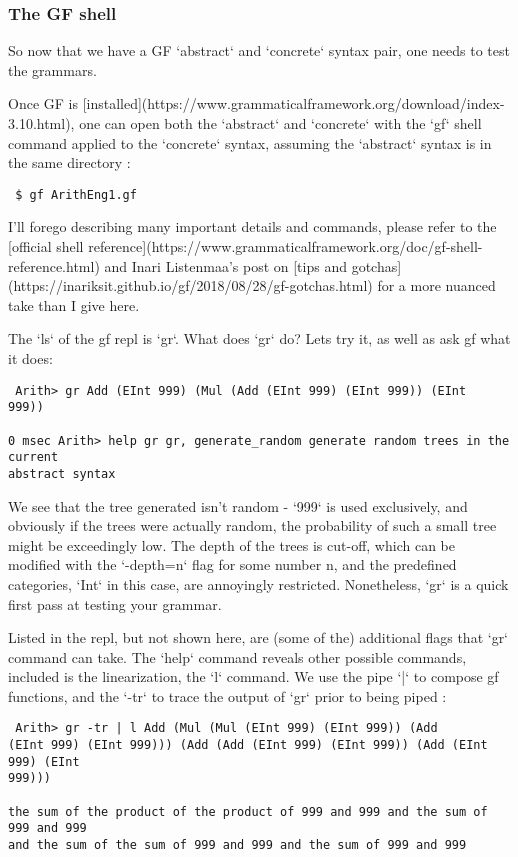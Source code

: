 \subsubsection{The GF shell}

So now that we have a GF `abstract` and `concrete` syntax pair, one needs to
test the grammars.

Once GF is
[installed](https://www.grammaticalframework.org/download/index-3.10.html), one
can open both the `abstract` and `concrete` with the `gf` shell command applied
to the `concrete` syntax, assuming the `abstract` syntax is in the same
directory :

\begin{verbatim} $ gf ArithEng1.gf
\end{verbatim}

I'll forego describing many important details and commands, please refer to the
[official shell
reference](https://www.grammaticalframework.org/doc/gf-shell-reference.html) and
Inari Listenmaa's post on [tips and
gotchas](https://inariksit.github.io/gf/2018/08/28/gf-gotchas.html) for a more
nuanced take than I give here.

The `ls` of the gf repl is `gr`. What does `gr` do? Lets try it, as well as ask
gf what it does:

\begin{verbatim} Arith> gr Add (EInt 999) (Mul (Add (EInt 999) (EInt 999)) (EInt
999))

0 msec Arith> help gr gr, generate_random generate random trees in the current
abstract syntax
\end{verbatim}

We see that the tree generated isn't random - `999` is used exclusively, and
obviously if the trees were actually random, the probability of such a small
tree might be exceedingly low. The depth of the trees is cut-off, which can be
modified with the `-depth=n` flag for some number n, and the predefined
categories, `Int` in this case, are annoyingly restricted. Nonetheless, `gr` is
a quick first pass at testing your grammar.

Listed in the repl, but not shown here, are (some of the) additional flags that
`gr` command can take. The `help` command reveals other possible commands,
included is the linearization, the `l` command. We use the pipe `|` to compose
gf functions, and the `-tr` to trace the output of `gr` prior to being piped :

\begin{verbatim} Arith> gr -tr | l Add (Mul (Mul (EInt 999) (EInt 999)) (Add
(EInt 999) (EInt 999))) (Add (Add (EInt 999) (EInt 999)) (Add (EInt 999) (EInt
999)))

the sum of the product of the product of 999 and 999 and the sum of 999 and 999
and the sum of the sum of 999 and 999 and the sum of 999 and 999
\end{verbatim}

